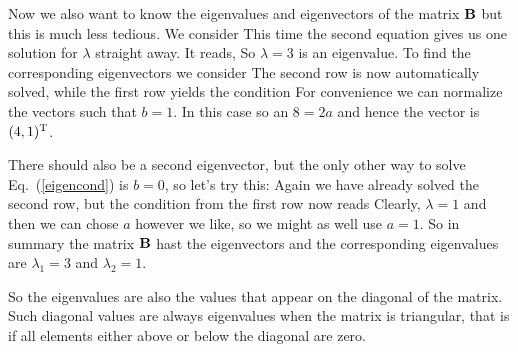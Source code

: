 Now we also want to know the eigenvalues and eigenvectors of the matrix $\bf B$ but this is much less tedious. We consider
This time the second equation gives us one solution for $\lambda$ straight away. It reads, 
So $\lambda=3$ is an eigenvalue. To find the corresponding eigenvectors we consider  
The second row is now automatically solved, while the first row yields the condition 
For convenience we can normalize the vectors such that $b=1$. In this case 
so an $8=2a$ and hence the vector is $(4,1)^{\rm T}$. 

There should also be a second eigenvector, but the only other way to solve Eq.~(\ref{eigencond}) is $b=0$, so let's try this:
Again we have already solved the second row, but the condition from the first row now reads
Clearly, $\lambda=1$ and then we can chose $a$ however we like, so we might as well use $a=1$. So in summary the matrix ${\bf B}$ hast the eigenvectors 
and the corresponding eigenvalues are $\lambda_1 = 3$ and $\lambda_2=1$.

So the eigenvalues are also the values that appear on the diagonal of the matrix. Such diagonal values are always eigenvalues when the matrix is triangular, that is if all elements either above or below the diagonal are zero. 

